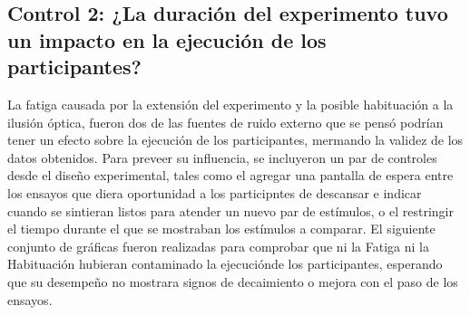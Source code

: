 \begin{itemize}

\end{itemize}










\subsection{Control 2: ¿La duración del experimento tuvo un impacto en la ejecución de los participantes?}

La fatiga causada por la extensión del experimento y la posible habituación a la ilusión óptica, fueron dos de las fuentes de ruido externo que se pensó podrían tener un efecto sobre la ejecución de los participantes, mermando la validez de los datos obtenidos. Para preveer su influencia, se incluyeron un par de controles desde el diseño experimental, tales como el agregar una pantalla de espera entre los ensayos que diera oportunidad a los participntes de descansar e indicar cuando se sintieran listos para atender un nuevo par de estímulos, o el restringir el tiempo durante el que se mostraban los estímulos a comparar. El siguiente conjunto de gráficas fueron realizadas para comprobar que ni la Fatiga ni la Habituación hubieran contaminado la ejecuciónde los participantes, esperando que su desempeño no mostrara signos de decaimiento o mejora con el paso de los ensayos.\\ 

